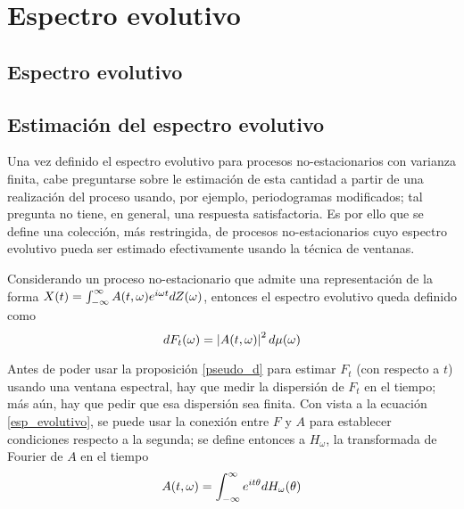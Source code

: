 
\chapter{Espectro evolutivo}


\section{Espectro evolutivo}


\section{Estimación del espectro evolutivo}

Una vez definido el espectro evolutivo para procesos no-estacionarios con varianza finita, cabe 
preguntarse sobre le estimación de esta cantidad a partir de una realización del proceso usando, 
por ejemplo, periodogramas modificados; tal pregunta no tiene, en general, una respuesta 
satisfactoria.
Es por ello que se define una colección, más restringida, de procesos no-estacionarios cuyo 
espectro evolutivo pueda ser estimado efectivamente usando la técnica de ventanas.

Considerando un proceso no-estacionario \xt que admite una representación de la forma 
$X(t) = \int_{-\infty}^{\infty} A(t,\omega) e^{i \omega t} dZ(\omega)$, entonces el espectro evolutivo queda definido 
como
\begin{equation}
dF_t(\omega) = \left| A(t,\omega) \right|^{2} d\mu(\omega)
\label{esp_evolutivo}
\end{equation}

Antes de poder usar la proposición \ref{pseudo_d} para estimar $F_t$ (con respecto a $t$) usando 
una ventana espectral, hay que medir la dispersión de $F_t$ en el tiempo; más aún, hay que pedir 
que esa dispersión sea finita.
Con vista a la ecuación \ref{esp_evolutivo}, se puede usar la conexión entre $F$ y $A$ para 
establecer condiciones respecto a la segunda; se define entonces a $H_\omega$, la transformada de
Fourier de $A$ en el tiempo
\begin{equation}
A(t,\omega) = \int_{-\infty}^{\infty} e^{i t \theta} dH_\omega(\theta)
\end{equation}


